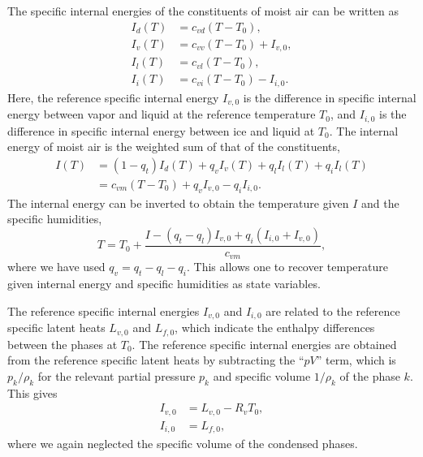 \documentclass{article}
\begin{document}
The specific internal energies of the constituents of moist air can be written as
\begin{subequations}\label{e:internal_energies}
\begin{align}
I_d(T) & = c_{vd} (T - T_0),  \\
I_v(T) & = c_{vv} (T - T_0) + I_{v,0},\\
I_l(T) & = c_{vl} (T - T_0), \\
I_i(T) & = c_{vi} (T - T_0) - I_{i,0}.
\end{align}
\end{subequations}
Here, the reference specific internal energy $I_{v,0}$ is the difference in specific internal energy between vapor and liquid at the reference temperature $T_0$, and $I_{i,0}$ is the difference in specific internal energy between ice and liquid at $T_0$. The internal energy of moist air is the weighted sum of that of the constituents,
\begin{equation}
\begin{split}
     I(T) & = (1-q_t) I_d(T) + q_v I_v(T) + q_l I_l(T) + q_i I_l(T)\\
          & = c_{vm} (T - T_0)  + q_v I_{v,0} - q_i I_{i,0}.
     \label{eq:total_internal_energy}
\end{split}
\end{equation}
The internal energy can be inverted to obtain the temperature given $I$ and the specific humidities,
\begin{equation}
    T = T_0 + \frac{I - (q_t - q_l) I_{v,0} + q_i (I_{i,0} + I_{v,0})}{c_{vm}},
    \label{eq:temperature}
\end{equation}
where we have used $q_v = q_t - q_l - q_i$. This allows one to recover temperature given internal energy and specific humidities as state variables.

The reference specific internal energies $I_{v,0}$ and $I_{i,0}$ are related to the reference specific latent heats $L_{v,0}$ and $L_{f,0}$, which indicate the enthalpy differences between the phases at $T_0$. The reference specific internal energies are obtained from the reference specific latent heats by subtracting the ``$pV$'' term, which is $p_k/\rho_k$ for the relevant partial pressure $p_k$ and specific volume $1/\rho_k$ of the phase $k$. This gives
\begin{subequations}\label{e:ref_internal_energies}
\begin{align}
     I_{v,0} &= L_{v, 0} - R_v T_0,\\
     I_{i,0} &= L_{f, 0},
\end{align}
\end{subequations}
where we again neglected the specific volume of the condensed phases. 
   
\end{document}
